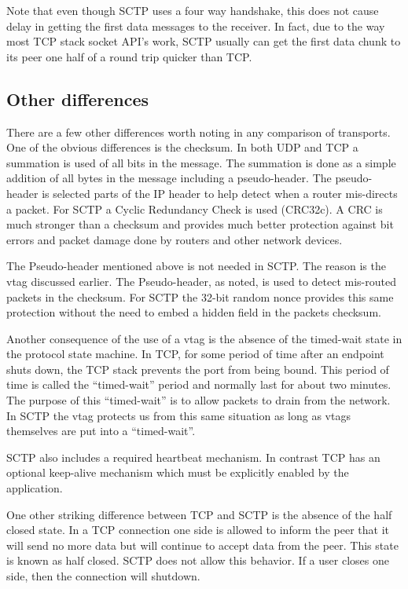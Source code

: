 \documentclass[conference]{IEEEtran}
\begin{document}
Note that even though SCTP uses a four way handshake, this does not
cause delay in getting the first data messages to the receiver. In fact,
due to the way most TCP stack socket API's work, SCTP usually can get
the first data chunk to its peer one half of a round trip quicker than TCP.

\subsection{Other differences}
\label{miscdiff}

There are a few other differences worth noting in any comparison of
transports. One of the obvious differences is the checksum. In both
UDP and TCP a summation is used of all bits in the message. The summation
is done as a simple addition of all bytes in the message including a
pseudo-header. The pseudo-header is selected parts of the IP
header to help detect when a router mis-directs a packet. For SCTP
a Cyclic Redundancy Check is used (CRC32c). A CRC is much stronger
than a checksum and provides much better protection against
bit errors and packet damage done by routers and other network
devices. 

The Pseudo-header mentioned above is not needed in SCTP. The reason
is the vtag discussed earlier. The Pseudo-header, as noted, is used to
detect mis-routed packets in the checksum. For SCTP the 32-bit random
nonce provides this same protection without the need to embed a
hidden field in the packets checksum.

Another consequence of the use of a vtag is the absence of 
the timed-wait state in the protocol state machine. In TCP, for
some period of time after an endpoint shuts down, the TCP stack
prevents the port from being bound. This period of time is called
the ``timed-wait'' period and normally last for about
two minutes.  The purpose of this ``timed-wait'' is to allow
packets to drain from the network. In SCTP the vtag protects
us from this same situation as long as vtags themselves are
put into a ``timed-wait''.

SCTP also includes a required heartbeat mechanism. In contrast
TCP has an optional keep-alive mechanism which must be explicitly
enabled by the application. 

One other striking difference between TCP and SCTP is the absence
of the half closed state. In a TCP connection one side is allowed to
inform the peer that it will send no more data but will continue to accept
data from the peer. This state is known as half closed. SCTP does not
allow this behavior. If a user closes one side, then the connection will
shutdown.
\end{document}
